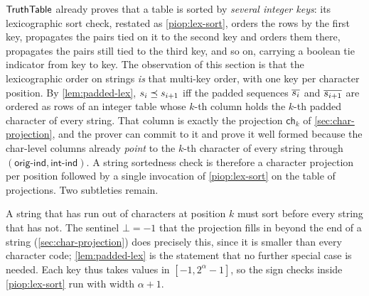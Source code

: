 $\mathsf{TruthTable}$ already proves that a table is sorted by \emph{several integer keys}: its lexicographic sort check, restated as \cref{piop:lex-sort}, orders the rows by the first key, propagates the pairs tied on it to the second key and orders them there, propagates the pairs still tied to the third key, and so on, carrying a boolean tie indicator from key to key. The observation of this section is that the lexicographic order on strings \emph{is} that multi-key order, with one key per character position. By \cref{lem:padded-lex}, $s_i \preceq s_{i+1}$ iff the padded sequences $\overline{s_i}$ and $\overline{s_{i+1}}$ are ordered as rows of an integer table whose $k$-th column holds the $k$-th padded character of every string. That column is exactly the projection $\mathsf{ch}_k$ of \cref{sec:char-projection}, and the prover can commit to it and prove it well formed because the char-level columns already \emph{point} to the $k$-th character of every string through $(\mathsf{orig\text{-}ind}, \mathsf{int\text{-}ind})$. A string sortedness check is therefore a character projection per position followed by a single invocation of \cref{piop:lex-sort} on the table of projections. Two subtleties remain.

A string that has run out of characters at position $k$ must sort before every string that has not. The sentinel $\bot = -1$ that the projection fills in beyond the end of a string (\cref{sec:char-projection}) does precisely this, since it is smaller than every character code; \cref{lem:padded-lex} is the statement that no further special case is needed. Each key thus takes values in $[-1, 2^{\alpha}-1]$, so the sign checks inside \cref{piop:lex-sort} run with width $\alpha + 1$.

